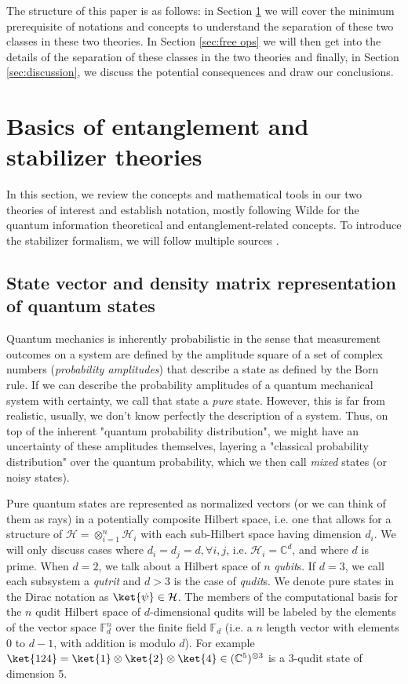 The structure of this paper is as follows: in Section \ref{sec:basics} we will cover the minimum prerequisite of notations and concepts to understand the separation of these two classes in these two theories. In Section \ref{sec:free ops} we will then get into the details of the separation of these classes in the two theories and finally, in Section \ref{sec:discussion}, we discuss the potential consequences and draw our conclusions. 

\section{Basics of entanglement and stabilizer theories}\label{sec:basics}

In this section, we review the concepts and mathematical tools in our two theories of interest and establish notation, mostly following Wilde \cite{wilde_quantum_2017} for the quantum information theoretical and entanglement-related concepts. To introduce the stabilizer formalism, we will follow multiple sources  \cite{gottesman_stabilizer_1997, aaronson_improved_2004, heimendahl_axiomatic_2022}. 

\subsection{State vector and density matrix representation of quantum states} 

Quantum mechanics is inherently probabilistic in the sense that measurement outcomes on a system are defined by the amplitude square of a set of complex numbers (\textit{probability amplitudes}) that describe a state as defined by the Born rule. If we can describe the probability amplitudes of a quantum mechanical system with certainty, we call that state a \textit{pure} state. However, this is far from realistic, usually, we don't know perfectly the description of a system. Thus, on top of the inherent "quantum probability distribution", we might have an uncertainty of these amplitudes themselves, layering a "classical probability distribution" over the quantum probability, which we then call \textit{mixed} states (or noisy states). 

Pure quantum states are represented as normalized vectors (or we can think of them as rays) in a potentially composite Hilbert space, i.e. one that allows for a structure of $\mathcal{H}=\otimes_{i=1}^n \mathcal{H}_i$ with each sub-Hilbert space having dimension $d_i$. We will only discuss cases where $d_i = d_j = d, \forall i, j$, i.e. $\mathcal{H}_i=\mathbb{C}^d$, and where $d$ is prime. When $d=2$, we talk about a Hilbert space of $n$ \textit{qubit}s. If $d=3$, we call each subsystem a \textit{qutrit} and $d>3$ is the case of \textit{qudit}s. We denote pure states in the Dirac notation as $\ket{\psi} \in \mathcal{H}$. The members of the computational basis for the $n$ qudit Hilbert space of $d$-dimensional qudits will be labeled by the elements of the vector space $\mathbb{F}_d^n$ over the finite field $\mathbb{F}_d$ (i.e. a $n$ length vector with elements 0 to $d-1$, with addition is modulo $d$).  For example $\ket{124} = \ket{1}\otimes \ket{2} \otimes  \ket{4} \in (\mathbb{C}^5)^{\otimes 3}$ is a 3-qudit state of dimension 5. 

